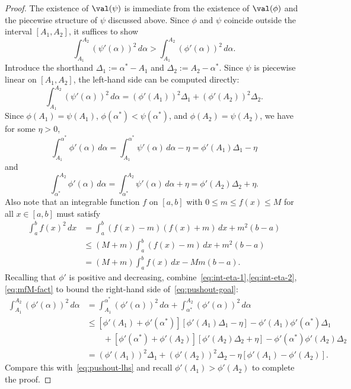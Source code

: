 \documentclass[11pt]{article}
\begin{document}
\begin{proof}
The existence of $\val(\psi)$ is immediate from the existence of $\val(\phi)$ and the piecewise structure of $\psi$ discussed above. Since $\phi$ and $\psi$ coincide outside the interval $[A_1,A_2]$, it suffices to show
\begin{equation}\label{eq:pushout-goal}
\int_{A_1}^{A_2} (\psi'(\alpha))^2 \,d\alpha > \int_{A_1}^{A_2} (\phi'(\alpha))^2 \,d\alpha.
\end{equation}
Introduce the shorthand $\Delta_1 := \alpha^* - A_1$ and $\Delta_2 := A_2 - \alpha^*$. Since $\psi$ is piecewise linear on $[A_1,A_2]$, the left-hand side can be computed directly:
\begin{equation}\label{eq:pushout-lhs}
\int_{A_1}^{A_2} (\psi'(\alpha))^2 \,d\alpha = (\phi'(A_1))^2 \Delta_1 + (\phi'(A_2))^2 \Delta_2.
\end{equation}
Since $\phi(A_1) = \psi(A_1)$, $\phi(\alpha^*) < \psi(\alpha^*)$, and $\phi(A_2) = \psi(A_2)$, we have for some $\eta > 0$,
\begin{equation}\label{eq:int-eta-1}
\int_{A_1}^{\alpha^*} \phi'(\alpha) \,d\alpha = \int_{A_1}^{\alpha^*} \psi'(\alpha) \,d\alpha - \eta = \phi'(A_1) \Delta_1 - \eta
\end{equation}
and
\begin{equation}\label{eq:int-eta-2}
\int_{\alpha^*}^{A_2} \phi'(\alpha) \,d\alpha = \int_{\alpha^*}^{A_2} \psi'(\alpha) \,d\alpha + \eta = \phi'(A_2) \Delta_2 + \eta.
\end{equation}
Also note that an integrable function $f$ on $[a,b]$ with $0 \le m \le f(x) \le M$ for all $x \in [a,b]$ must satisfy
\begin{align}
\int_a^b f(x)^2 \,dx &= \int_a^b (f(x) - m)(f(x) + m) \,dx + m^2 (b-a) \nonumber \\
&\le (M+m) \int_a^b (f(x)-m)\,dx + m^2 (b-a) \nonumber \\
&= (M+m) \int_a^b f(x)\,dx - Mm(b-a).
\label{eq:mfM-fact}
\end{align}
Recalling that $\phi'$ is positive and decreasing, combine~\eqref{eq:int-eta-1},\eqref{eq:int-eta-2},\eqref{eq:mfM-fact} to bound the right-hand side of~\eqref{eq:pushout-goal}:
\begin{align*}
\int_{A_1}^{A_2} (\phi'(\alpha))^2 \,d\alpha &= \int_{A_1}^{\alpha^*} (\phi'(\alpha))^2 \,d\alpha + \int_{\alpha^*}^{A_2} (\phi'(\alpha))^2 \,d\alpha \\
&\le [\phi'(A_1) + \phi'(\alpha^*)] [\phi'(A_1) \Delta_1 - \eta] - \phi'(A_1) \phi'(\alpha^*) \Delta_1 \\
&\qquad + [\phi'(\alpha^*) + \phi'(A_2)] [\phi'(A_2) \Delta_2 + \eta] - \phi'(\alpha^*) \phi'(A_2) \Delta_2 \\
&= (\phi'(A_1))^2 \Delta_1 + (\phi'(A_2))^2 \Delta_2 - \eta[\phi'(A_1) - \phi'(A_2)].
\end{align*}
Compare this with~\eqref{eq:pushout-lhs} and recall $\phi'(A_1) > \phi'(A_2)$ to complete the proof.
\end{proof}
\end{document}
